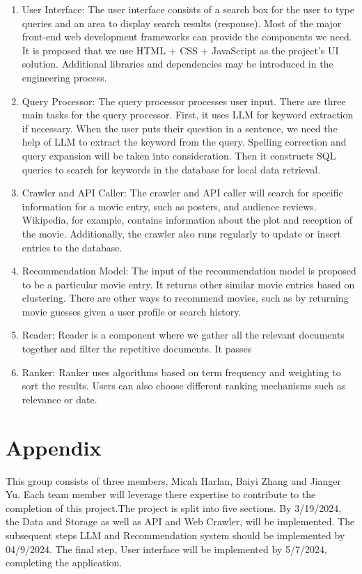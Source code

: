 \documentclass[journal]{IEEEtran}
\begin{document}
\begin{enumerate}
    \item  {User Interface}: The user interface consists of a search box for the user to type queries and an area to display search results (response). Most of the major front-end web development frameworks can provide the components we need. It is proposed that we use HTML + CSS + JavaScript as the project’s UI solution. Additional libraries and dependencies may be introduced in the engineering process.

    \item {Query Processor}: The query processor processes user input. There are three main tasks for the query processor. First, it uses LLM for keyword extraction if necessary. When the user puts their question in a sentence, we need the help of LLM to extract the keyword from the query. Spelling correction and query expansion will be taken into consideration. Then it constructs SQL queries to search for keywords in the database for local data retrieval.

    \item {Crawler and API Caller}: The crawler and API caller will search for specific information for a movie entry, such as posters, and audience reviews. Wikipedia, for example, contains information about the plot and reception of the movie. Additionally, the crawler also runs regularly to update or insert entries to the database.

    \item {Recommendation Model}: The input of the recommendation model is proposed to be a particular movie entry. It returns other similar movie entries based on clustering. There are other ways to recommend movies, such as by returning movie guesses given a user profile or search history.

    \item {Reader}: Reader is a component where we gather all the relevant documents together and filter the repetitive documents. It passes 

    \item {Ranker}: Ranker uses algorithms based on term frequency and weighting to sort the results. Users can also choose different ranking mechanisms such as relevance or date.
\end{enumerate}

\section{Appendix}
This group consists of three members, Micah Harlan, Baiyi Zhang and Jianger Yu. Each team member will leverage there expertise to contribute to the completion of this project.The project is split into five sections. By 3/19/2024, the Data and Storage as well as API and Web Crawler, will be implemented. The subsequent steps LLM and Recommendation system should be implemented by 04/9/2024. The final step, User interface will be implemented by 5/7/2024, completing the application.



\end{document}
